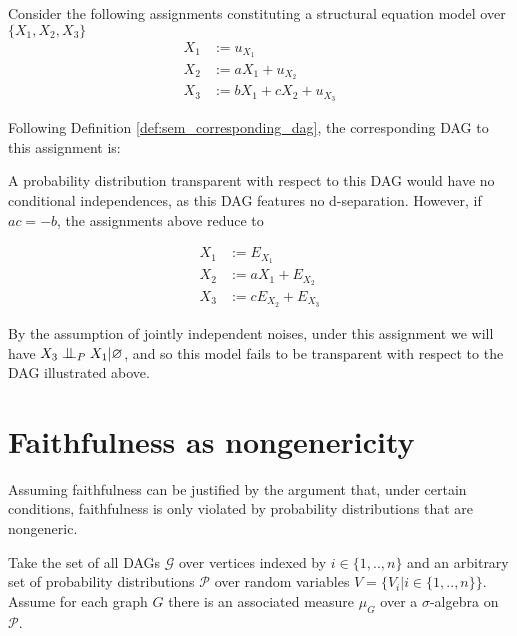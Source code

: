 \begin{example}\label{ex:linear_unfaithfulness}
Consider the following assignments constituting a structural equation model over $\{X_1,X_2,X_3\}$
\begin{align*}
    X_1 &:= u_{X_1} \\
    X_2 &:= a X_1 + u_{X_2} \\
    X_3 &:= b X_1 + c X_2 + u_{X_3}
\end{align*}

Following Definition \ref{def:sem_corresponding_dag}, the corresponding DAG to this assignment is:

\begin {center}
\end{center}

A probability distribution transparent with respect to this DAG would have no conditional independences, as this DAG features no d-separation. However, if $ac=-b$, the assignments above reduce to 

\begin{align*}
    X_1 &:= E_{X_1} \\
    X_2 &:= a X_1 + E_{X_2} \\
    X_3 &:= c E_{X_2} + E_{X_3}
\end{align*}

By the assumption of jointly independent noises, under this assignment we will have $X_3 \CI_P X_1 | \varnothing$, and so this model fails to be transparent with respect to the DAG illustrated above.
\end{example}

\section{Faithfulness as nongenericity}

Assuming faithfulness can be justified by the argument that, under certain conditions, faithfulness is only violated by probability distributions that are nongeneric.

Take the set of all DAGs $\mathcal{G}$ over vertices indexed by $i\in\{1,..,n\}$ and an arbitrary set of probability distributions $\mathcal{P}$ over random variables $V=\{V_i|i\in\{1,..,n\}\}$. Assume for each graph $G$ there is an associated measure $\mu_G$ over a $\sigma$-algebra on $\mathcal{P}$.

